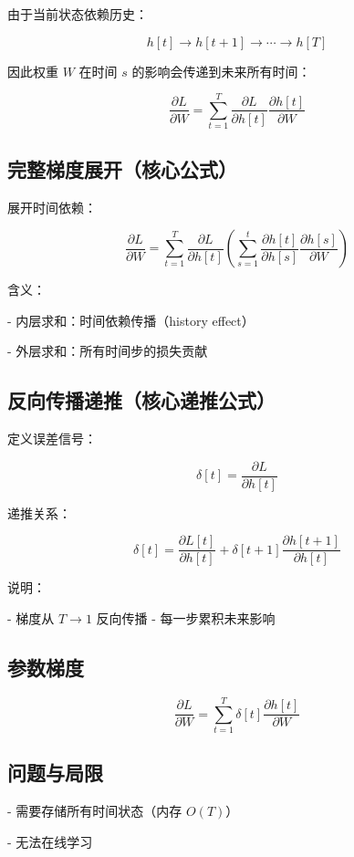 \documentclass[journal,12pt,onecolumn]{IEEEtran}
\begin{document}
由于当前状态依赖历史：

\[
h[t] \rightarrow h[t+1] \rightarrow \cdots \rightarrow h[T]
\]

因此权重 $W$ 在时间 $s$ 的影响会传递到未来所有时间：

\[
\frac{\partial L}{\partial W}
= \sum_{t=1}^{T} \frac{\partial L}{\partial h[t]} \frac{\partial h[t]}{\partial W}
\]

\subsection{完整梯度展开（核心公式）}

展开时间依赖：

\[
\frac{\partial L}{\partial W}
=
\sum_{t=1}^{T}
\frac{\partial L}{\partial h[t]}
\left(
\sum_{s=1}^{t}
\frac{\partial h[t]}{\partial h[s]}
\frac{\partial h[s]}{\partial W}
\right)
\]

含义：

- 内层求和：时间依赖传播（history effect）

- 外层求和：所有时间步的损失贡献

\subsection{反向传播递推（核心递推公式）}

定义误差信号：

\[
\delta[t] = \frac{\partial L}{\partial h[t]}
\]

递推关系：

\[
\delta[t] =
\frac{\partial L[t]}{\partial h[t]}
+
\delta[t+1]
\frac{\partial h[t+1]}{\partial h[t]}
\]

说明：

- 梯度从 $T \rightarrow 1$ 反向传播
- 每一步累积未来影响

\subsection{参数梯度}

\[
\frac{\partial L}{\partial W}
=
\sum_{t=1}^{T}
\delta[t]
\frac{\partial h[t]}{\partial W}
\]


\subsection{问题与局限}

- 需要存储所有时间状态（内存 $O(T)$）

- 无法在线学习
\end{document}
